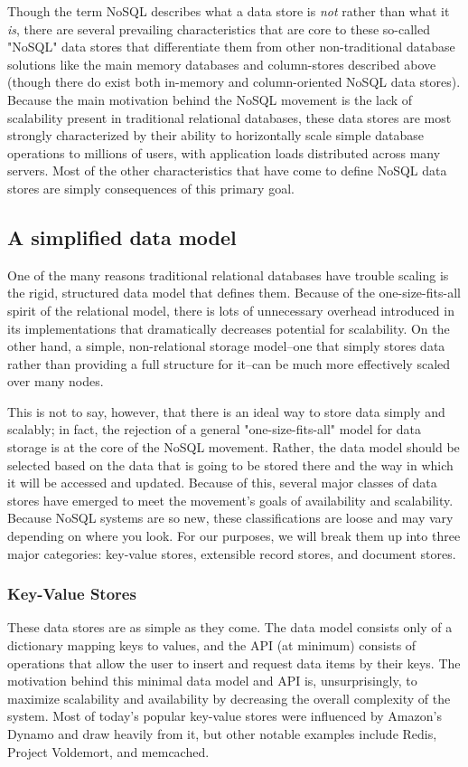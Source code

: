 \documentclass[11pt,a4paper]{report}
\begin{document}
Though the term NoSQL describes what a data store is \textit{not} rather than what it \textit{is}, there are several prevailing characteristics that are core to these so-called "NoSQL" data stores that differentiate them from other non-traditional database solutions like the main memory databases and column-stores described above (though there do exist both in-memory and column-oriented NoSQL data stores). Because the main motivation behind the NoSQL movement is the lack of scalability present in traditional relational databases, these data stores are most strongly characterized by their ability to horizontally scale simple database operations to millions of users, with application loads distributed across many servers.\cite{strauch2011nosql} Most of the other characteristics that have come to define NoSQL data stores are simply consequences of this primary goal.

\subsection{A simplified data model}
One of the many reasons traditional relational databases have trouble scaling is the rigid, structured data model that defines them. Because of the one-size-fits-all spirit of the relational model, there is lots of unnecessary overhead introduced in its implementations that dramatically decreases potential for scalability. On the other hand, a simple, non-relational storage model--one that simply stores data rather than providing a full structure for it--can be much more effectively scaled over many nodes. 

This is not to say, however, that there is an ideal way to store data simply and scalably; in fact, the rejection of a general "one-size-fits-all" model for data storage is at the core of the NoSQL movement. Rather, the data model should be selected based on the data that is going to be stored there and the way in which it will be accessed and updated. Because of this, several major classes of data stores have emerged to meet the movement's goals of availability and scalability. Because NoSQL systems are so new, these classifications are loose and may vary depending on where you look. For our purposes, we will break them up into three major categories: key-value stores, extensible record stores, and document stores.

\subsubsection{Key-Value Stores}
These data stores are as simple as they come. The data model consists only of a dictionary mapping keys to values, and the API (at minimum) consists of operations that allow the user to insert and request data items by their keys.\cite{strauch2011nosql} The motivation behind this minimal data model and API is, unsurprisingly, to maximize scalability and availability by decreasing the overall complexity of the system. Most of today's popular key-value stores were influenced by Amazon's Dynamo and draw heavily from it, but other notable examples include Redis, Project Voldemort, and memcached. 
 
\end{document}
